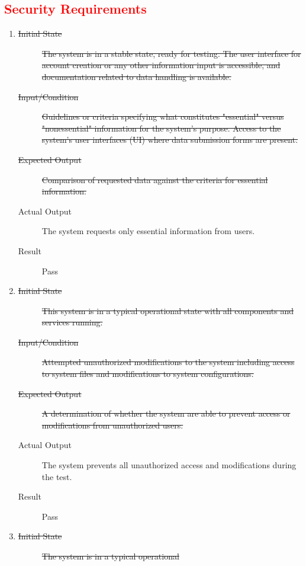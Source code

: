 \documentclass[12pt, titlepage]{article}
\newcommand{\rt}[1]{\textcolor{red}{#1}}
\begin{document}
\rt{\subsection{Security Requirements}}
\begin{enumerate}
\item \label{NFRT22}
  \begin{description}
  \item[\sout{Initial State}] \sout{The system is in a stable state, ready for
      testing. The user interface for account creation or any other
      information input is accessible, and documentation related to data
      handling is available.}
  \item[\sout{Input/Condition}] \sout{Guidelines or criteria specifying what
      constitutes "essential" versus "nonessential" information for the
      system’s purpose. Access to the system's user interfaces (UI) where
      data submission forms are present.}
  \item[\sout{Expected Output}] \sout{Comparison of requested data against the
      criteria for essential information.}
  \item[Actual Output] The system requests only essential information from users.
  \item[Result] Pass
  \end{description}
\item \label{NFRT23}
  \begin{description}
  \item[\sout{Initial State}] \sout{This system is in a typical operational
      state with all components and services running.}
  \item[\sout{Input/Condition}] \sout{Attempted unauthorized modifications to
      the system including access to system files and modifications to
      system configurations.}
  \item[\sout{Expected Output}] \sout{A determination of whether the system are
      able to prevent access or modifications from unauthorized users.}
  \item[Actual Output] The system prevents all unauthorized access and
    modifications during the test.
  \item[Result] Pass
  \end{description}
\item \label{NFRT24}
  \begin{description}
  \item[\sout{Initial State}] \sout{The system is in a typical operational
}
\end{description}
\end{enumerate}
\end{document}
